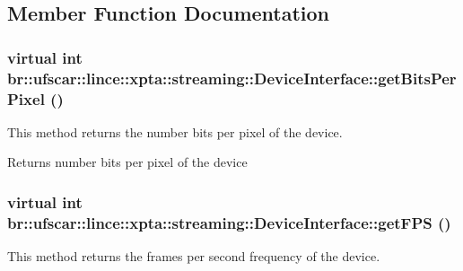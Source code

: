 \subsection{Member Function Documentation}
\hypertarget{classbr_1_1ufscar_1_1lince_1_1xpta_1_1streaming_1_1DeviceInterface_af71e87af3a4635ff79a9e11a860d2c22}{
\subsubsection[{getBitsPerPixel}]{\setlength{\rightskip}{0pt plus 5cm}virtual int br::ufscar::lince::xpta::streaming::DeviceInterface::getBitsPerPixel ()}}
\label{classbr_1_1ufscar_1_1lince_1_1xpta_1_1streaming_1_1DeviceInterface_af71e87af3a4635ff79a9e11a860d2c22}


This method returns the number bits per pixel of the device. 

\begin{DoxyReturn}{Returns}
number bits per pixel of the device 
\end{DoxyReturn}
\hypertarget{classbr_1_1ufscar_1_1lince_1_1xpta_1_1streaming_1_1DeviceInterface_a5693a8dba7af4ddb3329f4f301ef83b3}{
\subsubsection[{getFPS}]{\setlength{\rightskip}{0pt plus 5cm}virtual int br::ufscar::lince::xpta::streaming::DeviceInterface::getFPS ()}}
\label{classbr_1_1ufscar_1_1lince_1_1xpta_1_1streaming_1_1DeviceInterface_a5693a8dba7af4ddb3329f4f301ef83b3}


This method returns the frames per second frequency of the device. 

